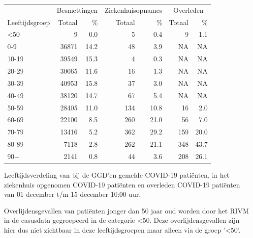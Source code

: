 \documentclass[
  english,
  man,floatsintext]{apa6}
\begin{document}
\begin{table}
\centering\begingroup\fontsize{11}{13}\selectfont

\begin{threeparttable}
\begin{tabular}{lrrrrrr}
\toprule
\multicolumn{1}{c}{ } & \multicolumn{2}{c}{Besmettingen} & \multicolumn{2}{c}{Ziekenhuisopnames} & \multicolumn{2}{c}{Overleden} \\
\cmidrule(l{3pt}r{3pt}){2-3} \cmidrule(l{3pt}r{3pt}){4-5} \cmidrule(l{3pt}r{3pt}){6-7}
Leeftijdsgroep & Totaal & \% & Totaal & \% & Totaal & \%\\
\midrule
<50 & 9 & 0.0 & 5 & 0.4 & 9 & 1.1\\
0-9 & 36871 & 14.2 & 48 & 3.9 & NA & NA\\
10-19 & 39549 & 15.3 & 4 & 0.3 & NA & NA\\
20-29 & 30065 & 11.6 & 16 & 1.3 & NA & NA\\
30-39 & 40953 & 15.8 & 37 & 3.0 & NA & NA\\
40-49 & 38120 & 14.7 & 67 & 5.4 & NA & NA\\
50-59 & 28405 & 11.0 & 134 & 10.8 & 16 & 2.0\\
60-69 & 22100 & 8.5 & 260 & 21.0 & 56 & 7.0\\
70-79 & 13416 & 5.2 & 362 & 29.2 & 159 & 20.0\\
80-89 & 7118 & 2.8 & 262 & 21.1 & 348 & 43.7\\
90+ & 2141 & 0.8 & 44 & 3.6 & 208 & 26.1\\
\bottomrule
\end{tabular}
\begin{tablenotes}
\item[1] Leeftijdsverdeling van bij de GGD’en gemelde COVID-19 patiënten, in het ziekenhuis opgenomen COVID-19 patiënten en overleden COVID-19 patiënten van 01 december t/m 15 december 10:00 uur.
\item[2] Overlijdensgevallen van patiënten jonger dan 50 jaar oud worden door het RIVM in de casusdata gegroepeerd in de categorie <50. Deze overlijdensgevallen zijn hier dus niet zichtbaar in deze leeftijdsgroepen maar alleen via de groep '<50'.
\end{tablenotes}
\end{threeparttable}
\endgroup{}
\end{table}

\newpage
\end{document}
